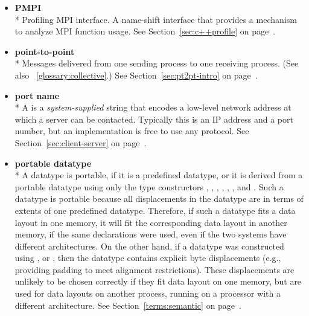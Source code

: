 \begin{itemize}
\label{glossary:PMPI}
\item \textbf{ PMPI} \\*
Profiling MPI interface. A name-shift interface that provides a mechanism to analyze MPI function usage.
See Section~\ref{sec:c++profile} on page~\pageref{sec:c++profile}.

\label{glossary:point-to-point}
\item \textbf{ point-to-point} \\*
Messages delivered from one sending process to one receiving process. (See also ~\ref{glossary:collective}.)
See Section~\ref{sec:pt2pt-intro} on page~\pageref{sec:pt2pt-intro}.

\label{glossary:port_name}
\item \textbf{ port name} \\*
A  is a {\em system-supplied} string that encodes a
low-level network address at which a server can be
contacted. Typically this is an IP address and a port number, but an
implementation is free to use any protocol.
See Section~\ref{sec:client-server} on page~\pageref{sec:client-server}.

\label{glossary:portable_datatype}
\item \textbf{ portable datatype} \\*
A datatype is portable, if it is a predefined datatype, or it is derived
from a portable datatype using only the type constructors
, ,
,
,
, , and
.
Such a datatype is portable because all displacements in the datatype
are in terms of extents of one predefined datatype.  Therefore, if such a
datatype fits a data layout in one memory, it will fit the
corresponding data layout in another memory, if the same declarations
were used, even if the two systems have different architectures.  On
the other hand, if a datatype was constructed using
,  or
, then the datatype contains explicit byte
displacements (e.g., providing padding to meet alignment restrictions).
These displacements are unlikely to be chosen correctly if they fit
data layout on one memory, but are used for data layouts on another
process, running on a processor with a different architecture.
See Section~\ref{terms:semantic} on page~\pageref{terms:semantic}.


\end{itemize}
